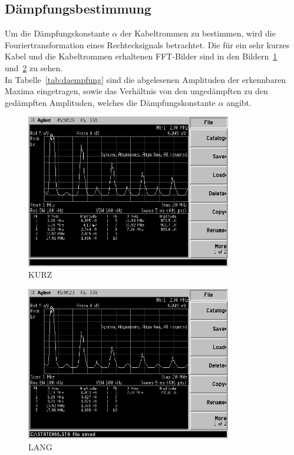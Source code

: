\subsection{Dämpfungsbestimmung}
%
Um die Dämpfungskonstante $\alpha$ der Kabeltrommen zu bestimmen, 
wird die Fouriertransformation eines Rechtecksignals betrachtet. Die 
für ein sehr kurzes Kabel und die Kabeltrommen erhaltenen FFT-Bilder 
sind in den Bildern~\ref{fig:daempfung_kurz} 
und~\ref{fig:daempfung_lang} zu sehen.\\
In Tabelle~\ref{tab:daempfung} sind die abgelesenen Amplituden der 
erkennbaren Maxima eingetragen, sowie das Verhältnis von den 
ungedämpften zu den gedämpften Amplituden, welches die 
Dämpfungskonstante $\alpha$ angibt.
%
\begin{figure}[]
\centering
\includegraphics[width=0.8\textwidth]{daempfung_kurz.png}
\caption{KURZ}
\label{fig:daempfung_kurz}
\end{figure}
%
\begin{figure}[]
\centering
\includegraphics[width=0.8\textwidth]{daempfung_lang.png}
\caption{LANG}
\label{fig:daempfung_lang}
\end{figure}
